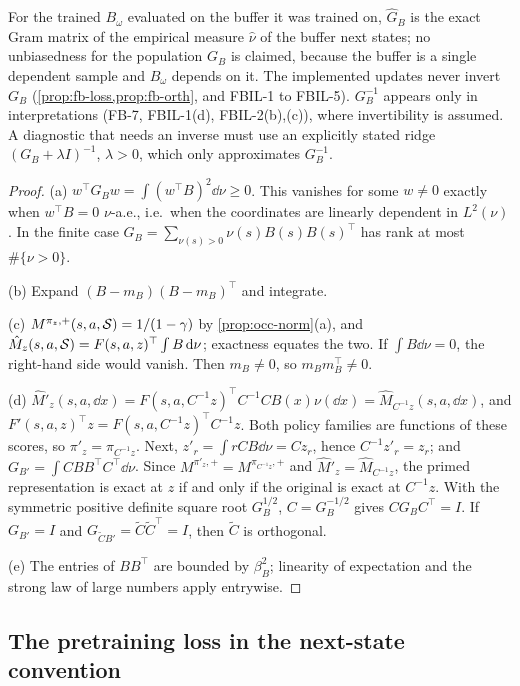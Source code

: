 \begin{proposition}
\begin{enumerate}[nosep,label=(\alph*)]
  For the trained $B_\omega$ evaluated on the buffer it was trained on, $\hat G_B$ is the exact Gram matrix of the empirical measure $\hat\nu$ of the buffer next states; no unbiasedness for the population $G_B$ is claimed, because the buffer is a single dependent sample and $B_\omega$ depends on it.
  The implemented updates never invert $G_B$ (\cref{prop:fb-loss,prop:fb-orth}, and FBIL-1 to FBIL-5). $G_B^{-1}$ appears only in interpretations (FB-7, FBIL-1(d), FBIL-2(b),(c)), where invertibility is assumed.
  A diagnostic that needs an inverse must use an explicitly stated ridge $(G_B+\lambda I)^{-1}$, $\lambda>0$, which only approximates $G_B^{-1}$.
\end{enumerate}
\end{proposition}
\begin{proof}
(a) $w^\top G_Bw=\int(w^\top B)^2\dd\nu\ge0$. This vanishes for some $w\ne0$ exactly when $w^\top B=0$ $\nu$-a.e., i.e.\ when the coordinates are linearly dependent in $L^2(\nu)$.
In the finite case $G_B=\sum_{\nu(s)>0}\nu(s)B(s)B(s)^\top$ has rank at most $\#\{\nu>0\}$.

(b) Expand $(B-m_B)(B-m_B)^\top$ and integrate.

(c) $M^{\pi_z,+}(s,a,\mathcal{S})=1/(1-\gamma)$ by \cref{prop:occ-norm}(a), and $\hat M_z(s,a,\mathcal{S})=F(s,a,z)^\top\int B\,\mathrm{d}\nu$; exactness equates the two.
If $\int B\dd\nu=0$, the right-hand side would vanish. Then $m_B\ne0$, so $m_Bm_B^\top\ne0$.

(d) $\hat M'_z(s,a,\dd x)=F(s,a,C^{-1}z)^\top C^{-1}CB(x)\nu(\dd x)=\hat M_{C^{-1}z}(s,a,\dd x)$, and $F'(s,a,z)^\top z=F(s,a,C^{-1}z)^\top C^{-1}z$.
Both policy families are functions of these scores, so $\pi'_z=\pi_{C^{-1}z}$.
Next, $z'_r=\int rCB\dd\nu=Cz_r$, hence $C^{-1}z'_r=z_r$; and $G_{B'}=\int CBB^\top C^\top\dd\nu$.
Since $M^{\pi'_z,+}=M^{\pi_{C^{-1}z},+}$ and $\hat M'_z=\hat M_{C^{-1}z}$, the primed representation is exact at $z$ if and only if the original is exact at $C^{-1}z$.
With the symmetric positive definite square root $G_B^{1/2}$, $C=G_B^{-1/2}$ gives $CG_BC^\top=I$.
If $G_{B'}=I$ and $G_{\tilde CB'}=\tilde C\tilde C^\top=I$, then $\tilde C$ is orthogonal.

(e) The entries of $BB^\top$ are bounded by $\beta_B^2$; linearity of expectation and the strong law of large numbers apply entrywise.
\end{proof}

\subsection{The pretraining loss in the next-state convention}\label{sec:fb-loss}

